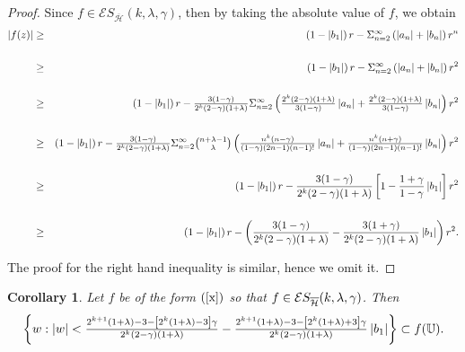 \documentclass[12pt,reqno]{amsart}
\newtheorem{corollary}{Corollary}
\begin{document}
\begin{proof}
Since $f\in \mathcal{E}S_{\overline{\mathcal{H}}}(k,\lambda ,\gamma )$, then
by taking the absolute value of $f$, we obtain%
\begin{eqnarray*}
\left\vert f(z)\right\vert &\geq &\left( 1-\left\vert b_{1}\right\vert
\right) r-\Sigma_{n=2}^{\infty}\left( \left\vert a_{n}\right\vert
+\left\vert b_{n}\right\vert \right) r^{n} \\
&& \\
&\geq &\left( 1-\left\vert b_{1}\right\vert \right)
r-\Sigma_{n=2}^{\infty}\left( \left\vert a_{n}\right\vert +\left\vert
b_{n}\right\vert \right) r^{2} \\
&& \\
&\geq &\left( 1-\left\vert b_{1}\right\vert \right) r-\tfrac{3(1-\gamma )}{%
2^{k}(2-\gamma )(1+\lambda )}\Sigma_{n=2}^{\infty}\left( \tfrac{%
2^{k}(2-\gamma )(1+\lambda )}{3(1-\gamma )}\left\vert a_{n}\right\vert +%
\tfrac{2^{k}(2-\gamma )(1+\lambda )}{3(1-\gamma )}\left\vert
b_{n}\right\vert \right) r^{2} \\
&& \\
&\geq &\left( 1-\left\vert b_{1}\right\vert \right) r-\tfrac{3(1-\gamma )}{%
2^{k}(2-\gamma )(1+\lambda )}\Sigma_{n=2}^{\infty}\tbinom{n+\lambda -1%
}{\lambda }\left( \tfrac{n^{k}(n-\gamma )}{(1-\gamma )(2n-1)(n-1)!}%
\left\vert a_{n}\right\vert +\tfrac{n^{k}(n+\gamma )}{(1-\gamma )(2n-1)(n-1)!%
}\left\vert b_{n}\right\vert \right) r^{2} \\
&& \\
&\geq &\left( 1-\left\vert b_{1}\right\vert \right) r-\frac{3(1-\gamma )}{%
2^{k}(2-\gamma )(1+\lambda )}\left[ 1-\frac{1+\gamma }{1-\gamma }\left\vert
b_{1}\right\vert \right] r^{2} \\
&& \\
&\geq &\left( 1-\left\vert b_{1}\right\vert \right) r-\left( \frac{%
3(1-\gamma )}{2^{k}(2-\gamma )(1+\lambda )}-\frac{3(1+\gamma )}{%
2^{k}(2-\gamma )(1+\lambda )}\left\vert b_{1}\right\vert \right) r^{2}.
\end{eqnarray*}

The proof for the right hand inequality is similar, hence we omit it.
\end{proof}

\begin{corollary}
Let $f$ be of the form $(\ref{x})$ so that $f\in \mathcal{E}S_{\overline{%
\mathcal{H}}}(k,\lambda ,\gamma )$. Then%
\begin{equation*}
\left\{ w:\left\vert w\right\vert <\tfrac{2^{k+1}(1+\lambda )-3-\left[
2^{k}(1+\lambda )-3\right] \gamma }{2^{k}(2-\gamma )(1+\lambda )}-\tfrac{%
2^{k+1}(1+\lambda )-3-\left[ 2^{k}(1+\lambda )+3\right] \gamma }{%
2^{k}(2-\gamma )(1+\lambda )}\left\vert b_{1}\right\vert \right\} \subset f(%
\mathbb{U}).
\end{equation*}
\end{corollary}
\end{document}
